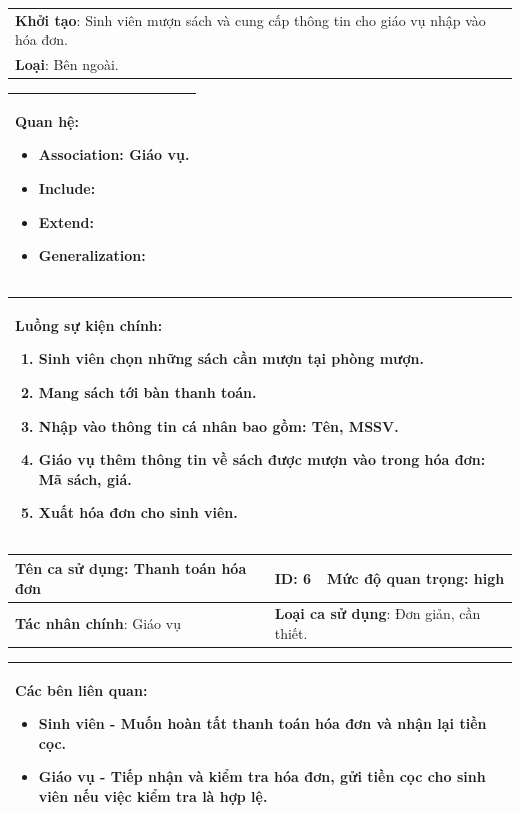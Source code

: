 \documentclass[../report.tex]{subfiles}
\begin{document}
\begin{center}
\begin{tabular}{| m{15.9cm} |}
    \hline
    \textbf{Khởi tạo}: Sinh viên mượn sách và cung cấp thông tin cho giáo vụ nhập vào hóa đơn. \\
    \textbf{Loại}: Bên ngoài.  \\
    \hline
\end{tabular}

\begin{tabular}{| m{15.9cm} |}
    \hline
    \textbf{Quan hệ}:
    \begin{itemize}
        \item Association: Giáo vụ. 
        \item Include: 
        \item Extend: 
        \item Generalization: 
    \end{itemize} \\
    \hline
\end{tabular}

\begin{tabular}{| m{15.9cm} |}
    \hline
    \textbf{Luồng sự kiện chính}:
    \begin{enumerate}
        \item Sinh viên chọn những sách cần mượn tại phòng mượn. 
        \item Mang sách tới bàn thanh toán. 
        \item Nhập vào thông tin cá nhân bao gồm: Tên, MSSV. 
        \item Giáo vụ thêm thông tin về sách được mượn vào trong hóa đơn: Mã sách, giá. 
        \item Xuất hóa đơn cho sinh viên. 
    \end{enumerate} \\
    \hline
\end{tabular}

\newpage
\begin{tabular}{| m{6cm} | m{3cm} | m{6cm} |}
    \hline
    \textbf{Tên ca sử dụng}: Thanh toán hóa đơn & \textbf{ID}: 6 & \textbf{Mức độ quan trọng}: high \\
    \hline
    \textbf{Tác nhân chính}: Giáo vụ & \multicolumn{2}{|l|}{\textbf{Loại ca sử dụng}: Đơn giản, cần thiết.} \\
    \hline
\end{tabular}
\begin{tabular}{| m{15.9cm} |}
    \hline
        \textbf{Các bên liên quan:} 
        \begin{itemize}
            \item Sinh viên - Muốn hoàn tất thanh toán hóa đơn và nhận lại tiền cọc. 
            \item Giáo vụ - Tiếp nhận và kiểm tra hóa đơn, gửi tiền cọc cho sinh viên nếu việc kiểm tra là hợp lệ. 
        \end{itemize} \\
    \hline
\end{tabular}


\end{center}
\end{document}
